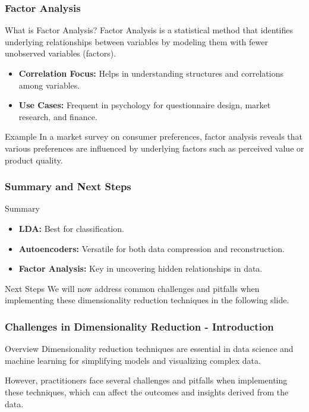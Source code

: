 \documentclass[aspectratio=169]{beamer}
\begin{document}
\begin{frame}
    \frametitle{Factor Analysis}
    \begin{block}{What is Factor Analysis?}
        Factor Analysis is a statistical method that identifies underlying relationships between variables by modeling them with fewer unobserved variables (factors).
    \end{block}

    \begin{itemize}
        \item \textbf{Correlation Focus:} Helps in understanding structures and correlations among variables.
        \item \textbf{Use Cases:} Frequent in psychology for questionnaire design, market research, and finance.
    \end{itemize}

    \begin{block}{Example}
        In a market survey on consumer preferences, factor analysis reveals that various preferences are influenced by underlying factors such as perceived value or product quality.
    \end{block}
\end{frame}

\begin{frame}
    \frametitle{Summary and Next Steps}
    \begin{block}{Summary}
        \begin{itemize}
            \item \textbf{LDA:} Best for classification.
            \item \textbf{Autoencoders:} Versatile for both data compression and reconstruction.
            \item \textbf{Factor Analysis:} Key in uncovering hidden relationships in data.
        \end{itemize}
    \end{block}

    \begin{block}{Next Steps}
        We will now address common challenges and pitfalls when implementing these dimensionality reduction techniques in the following slide.
    \end{block}
\end{frame}

\begin{frame}[fragile]
    \frametitle{Challenges in Dimensionality Reduction - Introduction}
    \begin{block}{Overview}
        Dimensionality reduction techniques are essential in data science and machine learning for simplifying models and visualizing complex data.
    \end{block}
    However, practitioners face several challenges and pitfalls when implementing these techniques, which can affect the outcomes and insights derived from the data.
\end{frame}
\end{document}
